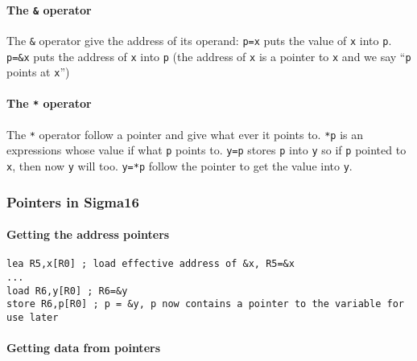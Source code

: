 \paragraph[The & operator]{The \texttt{&} operator}\label{par:the_ampersand_operator}

The \texttt{&} operator give the address of its operand:
\texttt{p=x} puts the value of  \texttt{x} into \texttt{p}.
\texttt{p=&x} puts the address of \texttt{x} into \texttt{p} (the address of \texttt{x} is a pointer to \texttt{x} and we say ``\texttt{p} points at \texttt{x}'')

\paragraph[The * operator]{The \texttt{*} operator}\label{par:the_asterisk_operator}

The \texttt{*} operator follow a pointer and give what ever it points to.
\texttt{*p}  is an expressions whose value if what \texttt{p} points to.
\texttt{y=p} stores \texttt{p} into \texttt{y} so if \texttt{p} pointed to \texttt{x}, then now \texttt{y} will too.
\texttt{y=*p} follow the pointer to get the value into \texttt{y}.

\subsubsection{Pointers in Sigma16}\label{ssub:pointers_in_sigma16}

\paragraph{Getting the address pointers}\label{par:getting_the_address_pointers}

\begin{verbatim}
lea R5,x[R0] ; load effective address of &x, R5=&x
...
load R6,y[R0] ; R6=&y
store R6,p[R0] ; p = &y, p now contains a pointer to the variable for use later
\end{verbatim}

\paragraph{Getting data from pointers}\label{par:getting_data_from_pointers}

